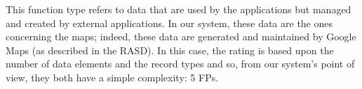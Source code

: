 This function type refers to data that are used by the applications but managed and created by external applications.
\newline
In our system, these data are the ones concerning the maps; indeed, these data are generated and maintained by Google Maps (as described in the RASD).
\newline
In this case, the rating is based upon the number of data elements and the record types and so, from our system's point of view, they both have a simple complexity: 5 FPs.